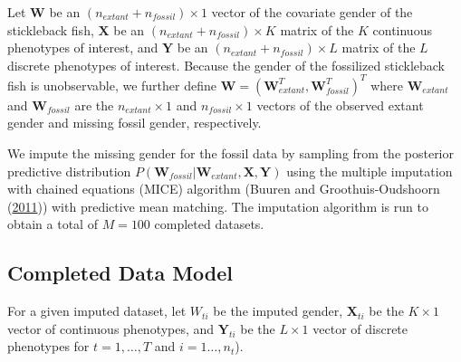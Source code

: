 \documentclass[
  12pt,
]{article}
\begin{document}
Let \(\boldsymbol{W}\) be an \((n_{extant} + n_{fossil}) \times 1\)
vector of the covariate gender of the stickleback fish,
\(\boldsymbol{X}\) be an \((n_{extant} + n_{fossil}) \times K\) matrix
of the \(K\) continuous phenotypes of interest, and \(\boldsymbol{Y}\)
be an \((n_{extant} + n_{fossil}) \times L\) matrix of the \(L\)
discrete phenotypes of interest. Because the gender of the fossilized
stickleback fish is unobservable, we further define
\(\boldsymbol{W} = (\boldsymbol{W}_{extant}^T,\boldsymbol{W}_{fossil}^T)^T\)
where \(\boldsymbol{W}_{extant}\) and \(\boldsymbol{W}_{fossil}\) are
the \(n_{extant} \times 1\) and \(n_{fossil} \times 1\) vectors of the
observed extant gender and missing fossil gender, respectively.

We impute the missing gender for the fossil data by sampling from the
posterior predictive distribution
\(P(\boldsymbol{W}_{fossil}|\boldsymbol{W}_{extant}, \boldsymbol{X}, \boldsymbol{Y})\)
using the multiple imputation with chained equations (MICE) algorithm
(Buuren and Groothuis-Oudshoorn (\protect\hyperlink{ref-MICE}{2011}))
with predictive mean matching. The imputation algorithm is run to obtain
a total of \(M = 100\) completed datasets.

\hypertarget{completed-data-model}{%
\subsection{Completed Data Model}\label{completed-data-model}}

For a given imputed dataset, let \(W_{ti}\) be the imputed gender,
\(\boldsymbol{X}_{ti}\) be the \(K \times 1\) vector of continuous
phenotypes, and \(\boldsymbol{Y}_{ti}\) be the \(L \times 1\) vector of
discrete phenotypes for \(t = 1, \ldots, T\) and \(i = 1\ldots,n_{t}\)).
\end{document}
